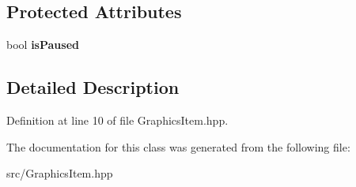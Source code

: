 \subsection*{Protected Attributes}
\begin{DoxyCompactItemize}
\item 
\mbox{\label{classGraphicsItem_a1a81e11e28f3ea510cd96c1eede3d905}} 
bool {\bfseries is\+Paused}
\end{DoxyCompactItemize}


\subsection{Detailed Description}


Definition at line 10 of file Graphics\+Item.\+hpp.



The documentation for this class was generated from the following file\+:\begin{DoxyCompactItemize}
\item 
src/Graphics\+Item.\+hpp\end{DoxyCompactItemize}
